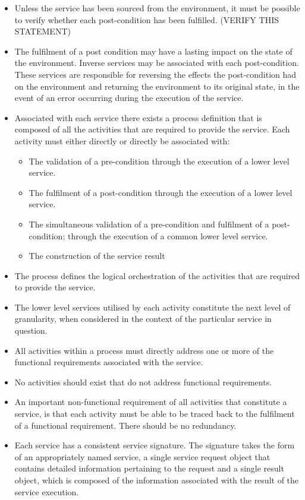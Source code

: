 \begin{itemize}
\begin{itemize}
\begin{itemize}
					\item Unless the service has been sourced from the environment, it must be possible to verify whether each post-condition has been fulfilled. (VERIFY THIS STATEMENT)
					\item The fulfilment of a post condition may have a lasting impact on the state of the environment. Inverse services may be associated with each post-condition. These services are responsible for reversing the effects the post-condition had on the environment and returning the environment to its original state, in the event of an error occurring during the execution of the service.
					\item Associated with each service there exists a process definition that is composed of all the activities that are required to provide the service. Each activity must either directly or directly be associated with:
						\begin{itemize}
							\item The validation of a pre-condition through the execution of a lower level service.
							\item The fulfilment of a post-condition through the execution of a lower level service.
							\item The simultaneous validation of a pre-condition and fulfilment of a post-condition; through the execution of a common lower level service.
							\item The construction of the service result
						\end{itemize}
					\item The process defines the logical orchestration of the activities that are required to provide the service.
					\item The lower level services utilised by each activity constitute the next level of granularity, when considered in the context of the particular service in question.
					\item All activities within a process must directly address one or more of the functional requirements associated with the service.
					\item No activities should exist that do not address functional requirements.
					\item An important non-functional requirement of all activities that constitute a service, is that each activity must be able to be traced back to the fulfilment of a functional requirement. There should be no redundancy.
					\item Each service has a consistent service signature. The signature takes the form of an appropriately named service, a single service request object that contains detailed information pertaining to the request and a single result object, which is composed of the information associated with the result of the service execution.

\end{itemize}
\end{itemize}
\end{itemize}
